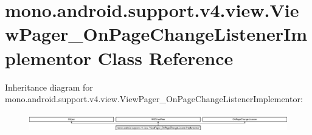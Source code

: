 \hypertarget{classmono_1_1android_1_1support_1_1v4_1_1view_1_1_view_pager___on_page_change_listener_implementor}{}\section{mono.\+android.\+support.\+v4.\+view.\+View\+Pager\+\_\+\+On\+Page\+Change\+Listener\+Implementor Class Reference}
\label{classmono_1_1android_1_1support_1_1v4_1_1view_1_1_view_pager___on_page_change_listener_implementor}
Inheritance diagram for mono.\+android.\+support.\+v4.\+view.\+View\+Pager\+\_\+\+On\+Page\+Change\+Listener\+Implementor\+:\begin{figure}[H]
\begin{center}
\leavevmode
\includegraphics[height=0.801144cm]{classmono_1_1android_1_1support_1_1v4_1_1view_1_1_view_pager___on_page_change_listener_implementor}
\end{center}
\end{figure}
